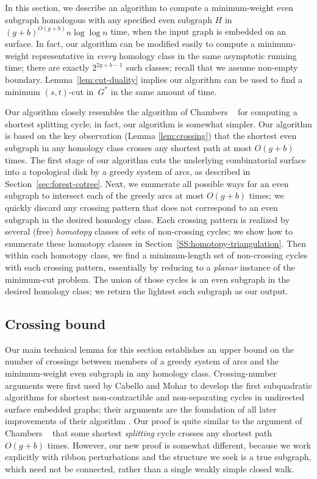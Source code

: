 \documentclass[letterpaper,review]{siamart190516}
\begin{document}
In this section, we describe an
algorithm to compute a minimum-weight even subgraph homologous with any specified even subgraph 
$H$ in $(g+b)^{O(g+b)}n\log \log n$ time, when the input graph is embedded on an  surface.  In fact, our algorithm can be
modified easily to compute a minimum-weight representative in
\emph{every} homology class in the same asymptotic running time;
there are exactly $2^{2g+b-1}$ such classes; recall that we assume non-empty boundary.
Lemma~\ref{lem:cut-duality} implies our algorithm can be used to find a minimum $(s,t)$-cut in~$G^*$ in the same amount of time.

Our algorithm closely resembles the algorithm of Chambers \etal~\cite{ccelw-scsih-08} for computing a shortest splitting cycle; in fact, our algorithm is somewhat simpler.  Our algorithm is based on the key observation (Lemma \ref{lem:crossing})  that the shortest even subgraph in any homology class crosses any shortest path at most $O(g+b)$ times.  The first stage of our algorithm cuts the underlying combinatorial surface into a topological disk by a greedy system of arcs, as described in Section~\ref{sec:forest-cotree}.  Next, we enumerate all possible ways for an even subgraph to intersect each of the greedy arcs at most $O(g+b)$ times; we quickly discard any crossing pattern that does not correspond to an even subgraph in the desired homology class.  Each crossing pattern is realized by several (free) \emph{homotopy} classes of sets of non-crossing cycles; we show how to enumerate these homotopy classes in Section~\ref{SS:homotopy-triangulation}.  Then within each homotopy class, we find a minimum-length set of non-crossing cycles with each crossing pattern, essentially by reducing to a \emph{planar} instance of the minimum-cut problem.  The union of those cycles is an even subgraph in the desired homology class; we return the lightest such subgraph as our output.


\subsection{Crossing bound}
\label{SS:homotopy-crossing}

Our main technical lemma for this section  establishes an upper bound on the number of crossings between members of a greedy system of arcs and the minimum-weight even subgraph in any homology class.  Crossing-number arguments were first used by Cabello and Mohar \cite{cm-fsnsn-07} to develop the first subquadratic algorithms for shortest non-contractible and non-separating cycles in undirected surface embedded graphs; their arguments are the foundation of all later improvements of their algorithm \cite{c-mdpg-06, k-csnco-06, cce-msspe-13}.  Our proof is quite similar to the argument of Chambers \etal~\cite{ccelw-scsih-08} that some shortest \emph{splitting} cycle crosses any shortest path $O(g+b)$ times.  However, our new proof is somewhat different, because we work explicitly with ribbon perturbations and the structure we seek is a true subgraph, which need not be connected, rather than a single weakly simple closed walk.
\end{document}
